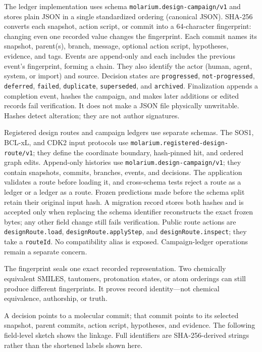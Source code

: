 The ledger implementation uses schema \texttt{molarium.design-campaign/v1} and
stores plain JSON in a
single standardized ordering (canonical JSON). SHA-256 converts each snapshot,
action script, or commit into a 64-character fingerprint: changing even one
recorded value changes the fingerprint. Each commit names its snapshot,
parent(s), branch, message, optional action script, hypotheses, evidence, and
tags. Events are append-only and each includes the previous event's fingerprint,
forming a chain. They also identify the actor (human, agent, system, or import)
and source.
Decision states are \texttt{progressed}, \texttt{not-progressed},
\texttt{deferred}, \texttt{failed}, \texttt{duplicate},
\texttt{superseded}, and \texttt{archived}. Finalization appends a completion
event, hashes the campaign, and makes later additions or edited records fail
verification. It does not make a JSON file physically unwritable. Hashes detect
alteration; they are not author signatures.

Registered design routes and campaign ledgers use separate schemas. The SOS1,
BCL-xL, and CDK2 input protocols use
\texttt{molarium.registered-\allowbreak design-\allowbreak route/v1}; they define the coordinate
boundary, hash-pinned hit, and ordered graph edits. Append-only histories use
\texttt{molarium.design-\allowbreak campaign/v1}; they contain snapshots, commits,
branches, events, and decisions. The application validates a route before
loading it, and cross-schema tests reject a route as a ledger or a ledger as a
route.
Frozen predictions made before the schema split retain their original input
hash. A migration record stores both hashes and is accepted only when replacing
the schema identifier reconstructs the exact frozen bytes; any other field
change still fails verification. Public route actions are
\texttt{designRoute.load}, \texttt{designRoute.applyStep}, and
\texttt{designRoute.inspect}; they take a \texttt{routeId}. No compatibility
alias is exposed. Campaign-ledger operations remain a separate concern.

The fingerprint seals one exact recorded representation. Two chemically
equivalent SMILES, tautomers, protonation states, or atom orderings can still
produce different fingerprints. It proves record identity---not chemical
equivalence, authorship, or truth.

A decision points to a molecular commit; that commit points to its selected
snapshot, parent commits, action script, hypotheses, and evidence. The following
field-level sketch shows the linkage. Full identifiers are SHA-256-derived
strings rather than the shortened labels shown here.

